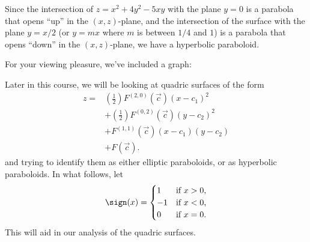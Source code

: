\documentclass{ximera}
\begin{document}
\begin{example}
\begin{explanation}
\begin{image}
    \end{image}
    Since the intersection of $z=x^2+4y^2-5xy$ with the plane $y=0$ is
    a parabola that opens ``up'' in the $(x,z)$-plane, and the
    intersection of the surface with the plane $y = x/2$ (or $y=mx$
    where $m$ is between $1/4$ and $1$) is a parabola that opens
    ``down'' in the $(x,z)$-plane, we have a hyperbolic paraboloid.
    \begin{onlineOnly}
      For your viewing pleasure, we've included a graph:
      \begin{center}    
      \end{center}
    \end{onlineOnly}
  \end{explanation}
\end{example}

Later in this course, we will be looking at quadric surfaces of the
form
\begin{align*}
  z = &\left(\frac{1}{2}\right)F^{(2,0)}(\vec{c})(x-c_1)^2\\
  &+ \left(\frac{1}{2}\right)F^{(0,2)}(\vec{c})(y-c_2)^2 \\
  &+ F^{(1,1)}(\vec{c}) (x-c_1)(y-c_2)\\
  &+ F(\vec{c}).
\end{align*}
and trying to identify them as either elliptic paraboloids, or as
hyperbolic paraboloids. In what follows, let
\[
\sign(x) =
\begin{cases}
  1  &\text{if $x>0$,}\\
  -1 &\text{if $x<0$,}\\
  0  &\text{if $x=0$.}
\end{cases}
\]
This will aid in our analysis of the quadric surfaces.
\end{document}
